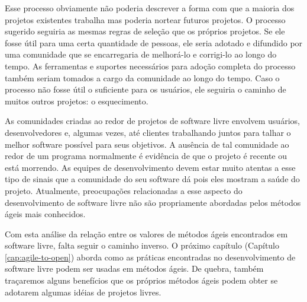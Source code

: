 Esse processo obviamente não poderia descrever a forma com que a
maioria dos projetos existentes trabalha mas poderia nortear futuros
projetos. O processo sugerido seguiria as mesmas regras de seleção que
os próprios projetos. Se ele fosse útil para uma certa quantidade de
pessoas, ele seria adotado e difundido por uma comunidade que se
encarregaria de melhorá-lo e corrigi-lo ao longo do tempo. As
ferramentas e suportes necessários para adoção completa do processo
também seriam tomados a cargo da comunidade ao longo do tempo. Caso o
processo não fosse útil o suficiente para os usuários, ele seguiria o
caminho de muitos outros projetos: o esquecimento.

As comunidades criadas ao redor de projetos de software livre envolvem
usuários, desenvolvedores e, algumas vezes, até clientes trabalhando
juntos para talhar o melhor software possível para seus objetivos. A
ausência de tal comunidade ao redor de um programa normalmente é
evidência de que o projeto é recente ou está morrendo. As equipes de
desenvolvimento devem estar muito atentas a esse tipo de sinais que a
comunidade do seu software dá pois eles mostram a saúde do
projeto. Atualmente, preocupações relacionadas a esse aspecto do
desenvolvimento de software livre não são propriamente abordadas pelos
métodos ágeis mais conhecidos.

Com esta análise da relação entre os valores de métodos ágeis
encontrados em software livre, falta seguir o caminho inverso. O
próximo capítulo (Capítulo \ref{cap:agile-to-open}) aborda como as
práticas encontradas no desenvolvimento de software livre podem ser
usadas em métodos ágeis. De quebra, também traçaremos alguns
benefícios que os próprios métodos ágeis podem obter se adotarem
algumas idéias de projetos livres.
